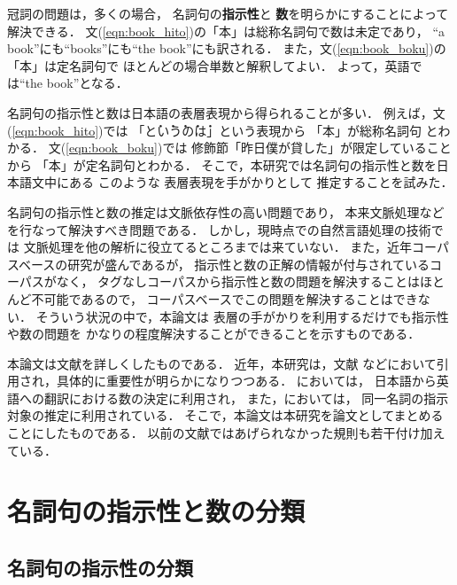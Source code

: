 冠詞の問題は，多くの場合，
名詞句の{\bf 指示性}と
{\bf 数}を明らかにすることによって解決できる．
文(\ref{eqn:book_hito})の「本」は総称名詞句で数は未定であり，
``a book''にも``books''にも``the book''にも訳される．
また，文(\ref{eqn:book_boku})の「本」は定名詞句で
ほとんどの場合単数と解釈してよい．
よって，英語では``the book''となる．


名詞句の指示性と数は日本語の表層表現から得られることが多い．
例えば，文(\ref{eqn:book_hito})では
「\.と\.い\.う\.の\.は」という表現から
「本」が総称名詞句
とわかる．
文(\ref{eqn:book_boku})では
修飾節「昨日僕が貸した」が限定していることから
「本」が定名詞句とわかる．
そこで，本研究では名詞句の指示性と数を日本語文中にある
このような
表層表現を手がかりとして
推定することを試みた．

名詞句の指示性と数の推定は文脈依存性の高い問題であり，
本来文脈処理などを行なって解決すべき問題である．
しかし，現時点での自然言語処理の技術では
文脈処理を他の解析に役立てるところまでは来ていない．
また，近年コーパスベースの研究が盛んであるが，
指示性と数の正解の情報が付与されているコーパスがなく，
タグなしコーパスから指示性と数の問題を解決することはほとんど不可能であるので，
コーパスベースでこの問題を解決することはできない．
そういう状況の中で，本論文は
表層の手がかりを利用するだけでも指示性や数の問題を
かなりの程度解決することができることを示すものである．

本論文は文献\cite{Murata1993B}を詳しくしたものである．
近年，本研究は，文献\cite{Bond1994,Murata1995}
などにおいて引用され，具体的に重要性が明らかになりつつある．
\cite{Bond1994}においては，
日本語から英語への翻訳における数の決定に利用され，
また，\cite{Murata1995}においては，
同一名詞の指示対象の推定に利用されている．
そこで，本論文は本研究を論文としてまとめることにしたものである．
以前の文献ではあげられなかった規則も若干付け加えている．


\section{名詞句の指示性と数の分類}\label{sec:riron}

\subsection{名詞句の指示性の分類}

